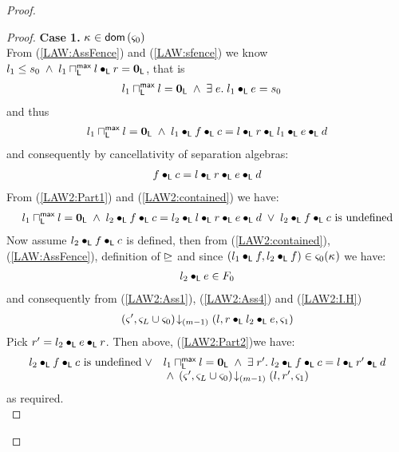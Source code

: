 \begin{lemma}[]
\begin{proof}
\begin{proof}
\noindent\textbf{Case 1. }$\kappa_{} \in \textsf{dom}\left( \varsigma_{0} \right)$\\
From (\ref{LAW:AssFence}) and (\ref{LAW:sfence}) we know $l_1 \leq s_0 \;\land\; l_1 \sqcap_{\textsf{L}}^{\textsf{max}} l \bullet_{\textsf{L}} r = \mathbf{0}_{\textsf{L}}$, that is 
%
\begin{align}
	& l_1 \sqcap_{\textsf{L}}^{\textsf{max}} l = \mathbf{0}_{\textsf{L}} \;\land\; \exists\; e.\; l_1 \bullet_{\textsf{L}} e = s_0 \label{LAW2:contained}
\end{align}
%
and thus
%
\begin{align}
	l_1 \sqcap_{\textsf{L}}^{\textsf{max}} l = \mathbf{0}_{\textsf{L}} \;\land\;  l_1 \bullet_{\textsf{L}} f \bullet_{\textsf{L}} c = l \bullet_{\textsf{L}}  r \bullet_{\textsf{L}} l_1 \bullet_{\textsf{L}} e \bullet_{\textsf{L}} d \nonumber
\end{align}
%
and consequently by cancellativity of separation algebras:
%
\begin{align}
	f \bullet_{\textsf{L}} c = l \bullet_{\textsf{L}} r \bullet_{\textsf{L}} e \bullet_{\textsf{L}} d \label{LAW2:Part1}
\end{align}
%
From (\ref{LAW2:Part1}) and (\ref{LAW2:contained}) we have:
%
\begin{align}
	l_1 \sqcap_{\textsf{L}}^{\textsf{max}} l = \mathbf{0}_{\textsf{L}} \;\land\;  l_2 \bullet_{\textsf{L}} f \bullet_{\textsf{L}} c = l_2 \bullet_{\textsf{L}} l \bullet_{\textsf{L}} r \bullet_{\textsf{L}} e \bullet_{\textsf{L}} d \;\lor\; l_2 \bullet_{\textsf{L}} f \bullet_{\textsf{L}} c \text{ is undefined} \label{LAW2:Part2}
\end{align}
%
Now assume $l_2 \bullet_{\textsf{L}} f \bullet_{\textsf{L}} c$ is defined, then from (\ref{LAW2:contained}), (\ref{LAW:AssFence}), definition of $\unrhd$ and since $(l_1 \bullet_{\textsf{L}} f, l_2 \bullet_{\textsf{L}} f) \in \varsigma_{0}(\kappa_{})$ we have:
%
\begin{align}
	l_2 \bullet_{\textsf{L}} e \in F_0 \label{LAW2:fenced}
\end{align}
%
and consequently from (\ref{LAW2:Ass1}), (\ref{LAW2:Ass4}) and (\ref{LAW2:I.H})
%
\begin{align}
	\left(\varsigma_{}', \varsigma_{L} \cup \varsigma_{0}\right) \!\downarrow_{(m-1)} \left(l, r \bullet_{\textsf{L}} l_2 \bullet_{\textsf{L}} e, \varsigma_{1}\right)
\end{align}
Pick $r' = l_2 \bullet_{\textsf{L}} e \bullet_{\textsf{L}} r$. Then above, (\ref{LAW2:Part2})we have:
%
\begin{align}
\begin{array}{l l}
	l_2 \bullet_{\textsf{L}} f \bullet_{\textsf{L}} c \text{ is undefined} \;\lor & l_1 \sqcap_{\textsf{L}}^{\textsf{max}} l = \mathbf{0}_{\textsf{L}} \;\land\; \exists\; r'.\; l_2 \bullet_{\textsf{L}} f \bullet_{\textsf{L}} c = l \bullet_{\textsf{L}} r' \bullet_{\textsf{L}} d\\
	& \hspace*{0.1cm}\land\; \left(\varsigma_{}', \varsigma_{L} \cup \varsigma_{0}\right) \!\downarrow_{(m-1)} \left(l, r', \varsigma_{1}\right)
\end{array} \nonumber
\end{align}
%
as required.\\


\end{proof}
\end{proof}
\end{lemma}
